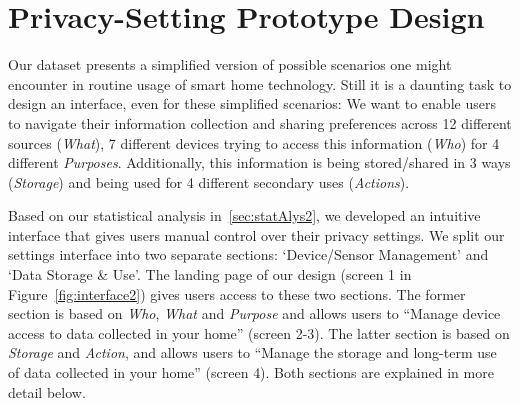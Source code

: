 %
%

\section{Privacy-Setting Prototype Design}\label{sec:design_stat}

Our dataset presents a simplified version of possible scenarios one might encounter in routine usage of smart home technology. Still it is a daunting task to design an interface, even for these simplified scenarios: We want to enable users to navigate their information collection and sharing preferences across 12 different sources (\emph{What}), 7 different devices trying to access this information (\emph{Who}) for 4 different \emph{Purposes}. Additionally, this information is being stored/shared in 3 ways (\emph{Storage}) and being used for 4 different secondary uses (\emph{Actions}). 

Based on our statistical analysis in~\ref{sec:statAlys2}, we developed an intuitive interface that gives users manual control over their privacy settings. We split our settings interface into two separate sections: `Device/Sensor Management' and `Data Storage \& Use'. The landing page of our design (screen 1 in Figure~\ref{fig:interface2}) gives users access to these two sections. The former section is based on \emph{Who}, \emph{What} and \emph{Purpose} and allows users to ``Manage device access to data collected in your home'' (screen 2-3). The latter section is based on \emph{Storage} and \emph{Action}, and allows users to ``Manage the storage and long-term use of data collected in your home'' (screen 4). Both sections are explained in more detail below.

